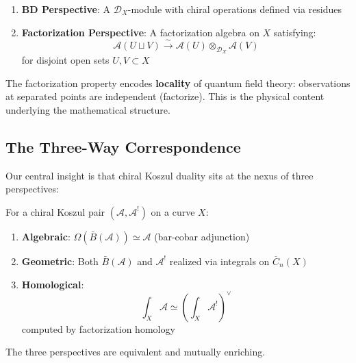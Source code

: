 \begin{enumerate}
\item \textbf{BD Perspective}: A $\mathcal{D}_X$-module with chiral operations defined via residues
\item \textbf{Factorization Perspective}: A factorization algebra on $X$ satisfying:
\begin{equation}
\mathcal{A}(U \sqcup V) \xrightarrow{\sim} \mathcal{A}(U) \otimes_{\mathcal{D}_X} \mathcal{A}(V)
\end{equation}
for disjoint open sets $U, V \subset X$
\end{enumerate}

\begin{remark}
The factorization property encodes \textbf{locality} of quantum field theory: observations at separated points are independent (factorize). This is the physical content underlying the mathematical structure.
\end{remark}

\subsection{The Three-Way Correspondence}

Our central insight is that chiral Koszul duality sits at the nexus of three perspectives:

\begin{center}
\end{center}

\begin{theorem}
\label{thm:three-way-correspondence}
For a chiral Koszul pair $(\mathcal{A}, \mathcal{A}^!)$ on a curve $X$:
\begin{enumerate}
\item \textbf{Algebraic}: $\Omega(\bar{B}(\mathcal{A})) \simeq \mathcal{A}$ (bar-cobar adjunction)
\item \textbf{Geometric}: Both $\bar{B}(\mathcal{A})$ and $\mathcal{A}^!$ realized via integrals on $\overline{C}_n(X)$
\item \textbf{Homological}: 
\begin{equation}
\int_X \mathcal{A} \simeq \left(\int_X \mathcal{A}^!\right)^\vee
\end{equation}
computed by factorization homology
\end{enumerate}
The three perspectives are equivalent and mutually enriching.
\end{theorem}

